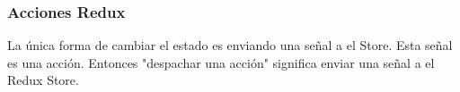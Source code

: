 

\subsubsection{Acciones Redux}
La única forma de cambiar el estado es enviando una señal a el Store. Esta señal es una acción. Entonces "despachar una acción" significa enviar una señal a el Redux Store.
\vspace{0.8cm}


